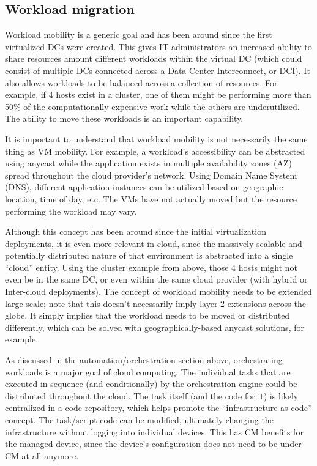 \subsection{Workload migration}
Workload mobility is a generic goal and has been around since the first
virtualized DCs were created. This gives IT administrators an increased
ability to share resources amount different workloads within the virtual DC
(which could consist of multiple DCs connected across a Data Center
Interconnect, or DCI). It also allows workloads to be balanced across a
collection of resources. For example, if 4 hosts exist in a cluster, one of
them might be performing more than 50\% of the computationally-expensive work
while the others are underutilized. The ability to move these workloads is an
important capability.

It is important to understand that workload mobility is not necessarily the
same thing as VM mobility. For example, a workload’s accessibility can be
abstracted using anycast while the application exists in multiple availability
zones (AZ) spread throughout the cloud provider’s network. Using Domain Name
System (DNS), different application instances can be utilized based on
geographic location, time of day, etc. The VMs have not actually moved but the
resource performing the workload may vary.

Although this concept has been around since the initial virtualization
deployments, it is even more relevant in cloud, since the massively scalable
and potentially distributed nature of that environment is abstracted into a
single ``cloud'' entity. Using the cluster example from above, those 4 hosts
might not even be in the same DC, or even within the same cloud provider (with
hybrid or Inter-cloud deployments). The concept of workload mobility needs to
be extended large-scale; note that this doesn’t necessarily imply layer-2
extensions across the globe. It simply implies that the workload needs to be
moved or distributed differently, which can be solved with
geographically-based anycast solutions, for example.

As discussed in the automation/orchestration section above, orchestrating
workloads is a major goal of cloud computing. The individual tasks that are
executed in sequence (and conditionally) by the orchestration engine could be
distributed throughout the cloud. The task itself (and the code for it) is
likely centralized in a code repository, which helps promote the
``infrastructure as code'' concept. The task/script code can be modified,
ultimately changing the infrastructure without logging into individual
devices. This has CM benefits for the managed device, since the device's
configuration does not need to be under CM at all anymore.
